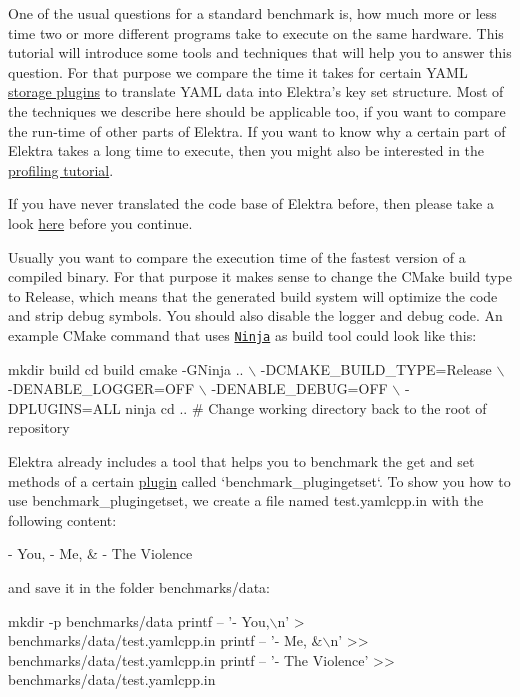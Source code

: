 One of the usual questions for a standard benchmark is, how much more or less time two or more different programs take to execute on the same hardware. This tutorial will introduce some tools and techniques that will help you to answer this question. For that purpose we compare the time it takes for certain Y\+A\+ML \hyperlink{doc_tutorials_storage-plugins_md}{storage plugins} to translate Y\+A\+ML data into Elektra’s key set structure. Most of the techniques we describe here should be applicable too, if you want to compare the run-\/time of other parts of Elektra. If you want to know why a certain part of Elektra takes a long time to execute, then you might also be interested in the \hyperlink{doc_tutorials_profiling_md}{profiling tutorial}.

If you have never translated the code base of Elektra before, then please take a look \hyperlink{doc_COMPILE_md}{here} before you continue.

Usually you want to compare the execution time of the fastest version of a compiled binary. For that purpose it makes sense to change the C\+Make build type to {\ttfamily Release}, which means that the generated build system will optimize the code and strip debug symbols. You should also disable the logger and debug code. An example C\+Make command that uses \href{https://ninja-build.org}{\tt Ninja} as build tool could look like this\+:


\begin{DoxyCode}
mkdir build
cd build
cmake -GNinja ..                 \(\backslash\)
      -DCMAKE\_BUILD\_TYPE=Release \(\backslash\)
      -DENABLE\_LOGGER=OFF        \(\backslash\)
      -DENABLE\_DEBUG=OFF         \(\backslash\)
      -DPLUGINS=ALL
ninja
cd .. # Change working directory back to the root of repository
\end{DoxyCode}


Elektra already includes a tool that helps you to benchmark the {\ttfamily get} and {\ttfamily set} methods of a certain \hyperlink{doc_tutorials_plugins_md}{plugin} called `benchmark\+\_\+plugingetset`. To show you how to use {\ttfamily benchmark\+\_\+plugingetset}, we create a file named {\ttfamily test.\+yamlcpp.\+in} with the following content\+:


\begin{DoxyCode}
- You,
- Me, &
- The Violence
\end{DoxyCode}


and save it in the folder {\ttfamily benchmarks/data}\+:


\begin{DoxyCode}
mkdir -p benchmarks/data
printf -- '- You,\(\backslash\)n'       >  benchmarks/data/test.yamlcpp.in
printf -- '- Me, &\(\backslash\)n'      >> benchmarks/data/test.yamlcpp.in
printf -- '- The Violence' >> benchmarks/data/test.yamlcpp.in
\end{DoxyCode}


